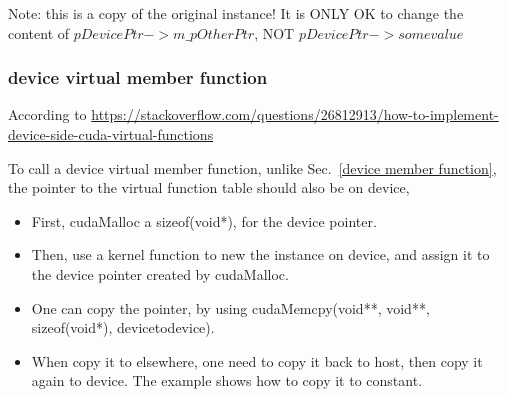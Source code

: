 \textcolor[rgb]{1,0,0}{Note: this is a copy of the original instance! It is ONLY OK to change the content of $pDevicePtr->m\_pOtherPtr$, NOT $pDevicePtr->somevalue$}

\subsubsection{\label{device virtual member function}device virtual member function}

According to \href{https://stackoverflow.com/questions/26812913/how-to-implement-device-side-cuda-virtual-functions}{https://stackoverflow.com/questions/26812913/how-to-implement-device-side-cuda-virtual-functions}

To call a device virtual member function, unlike Sec.~\ref{device member function}, the pointer to the virtual function table should also be on device,

\begin{itemize}
  \item First, cudaMalloc a sizeof(void*), for the device pointer.
  \item Then, use a kernel function to new the instance on device, and assign it to the device pointer created by cudaMalloc.
  \item One can copy the pointer, by using cudaMemcpy(void**, void**, sizeof(void*), devicetodevice).
  \item When copy it to elsewhere, one need to copy it back to host, then copy it again to device. The example shows how to copy it to constant.
\end{itemize}

